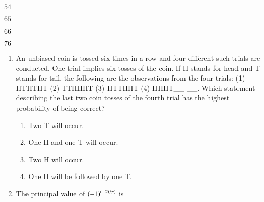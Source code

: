 \documentclass[journal,12pt,onecolumn]{IEEEtran}
\theoremstyle{remark}
\begin{document}
\begin{enumerate}[start=7]
    \begin{enumerate}
        \begin{multicols}{4}
            \item $54$
            \item $65$
            \item $66$
            \item $76$
        \end{multicols}
    \end{enumerate}
\end{enumerate}
\begin{enumerate}[start=10]
    \item An unbiased coin is tossed six times in a row and four different such trials are conducted. One trial implies six tosses of the coin. If H stands for head and T stands for tail, the following are the observations from the four trials: \newline (1) HTHTHT (2) TTHHHT (3) HTTHHT (4) HHHT\_\_ \_\_. \vspace{0.3cm}\newline Which statement describing the last two coin tosses of the fourth trial has the highest probability of being correct? \nolinebreak
    
    \hfill\mbox{}
    \begin{enumerate}
                \item Two T will occur.
            \item One H and one T will occur.
            \item Two H will occur.
            \item One H will be followed by one T.
        
    \end{enumerate}

\newpage




\item The principal value of $\left(-1\right)^{\left(-2i/\pi\right)}$ is

\hfill{}

\begin{enumerate}
\end{enumerate}


\end{enumerate}
\end{document}
